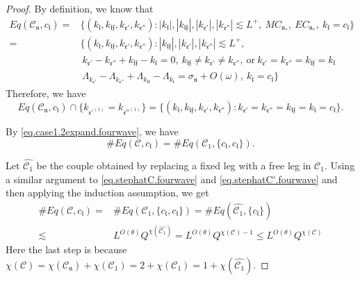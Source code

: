 \begin{proof}
    By definition, we know that 
    \begin{equation}
    \begin{split}
     Eq(\mathcal{C}_{\mathfrak{n}},c_{\mathfrak{l}})=&\{(k_{\mathfrak{l}}, k_{\mathfrak{l}\mathfrak{f}}, k_{\mathfrak{e}'}, k_{\mathfrak{e}''}): |k_{\mathfrak{l}}|, |k_{\mathfrak{l}\mathfrak{f}}|, |k_{\mathfrak{e}'}|, |k_{\mathfrak{e}''}| \lesssim L^+,\ MC_{\mathfrak{n}_*},\  EC_{\mathfrak{n}_*},\ k_{\mathfrak{l}}=c_{\mathfrak{l}}\}
     \\
     =&\{(k_{\mathfrak{l}}, k_{\mathfrak{l}\mathfrak{f}}, k_{\mathfrak{e}'}, k_{\mathfrak{e}''}): |k_{\mathfrak{l}\mathfrak{f}}|, |k_{\mathfrak{e}'}|, |k_{\mathfrak{e}''}| \lesssim L^+,
     \\
     &\ k_{\mathfrak{e}'}-k_{\mathfrak{e}''}+k_{\mathfrak{l}\mathfrak{f}}-k_{\mathfrak{l}}=0,\ k_{\mathfrak{l}\mathfrak{f}}\ne k_{\mathfrak{e}'}\ne k_{\mathfrak{e}''},\ \text{or}\ k_{\mathfrak{e}'}= k_{\mathfrak{e}''}=k_{\mathfrak{l}\mathfrak{f}}=k_{\mathfrak{l}}
     \\
     &\  \Lambda_{k_{\mathfrak{e}'}}-\Lambda_{k_{\mathfrak{e}''}}+\Lambda_{k_{\mathfrak{l}\mathfrak{f}}}-\Lambda_{k_{\mathfrak{l}}} =\sigma_{\mathfrak{n}}+O(\omega),\ k_{\mathfrak{l}}=c_{\mathfrak{l}}\}
    \end{split}
    \end{equation}
    Therefore, we have
    \begin{equation}
     Eq(\mathcal{C}_{\mathfrak{n}},c_{\mathfrak{l}})\cap \{k_{\mathfrak{e}'^{(1)}}=k_{\mathfrak{e}''^{(1)}}\}=\{(k_{\mathfrak{l}}, k_{\mathfrak{l}\mathfrak{f}}, k_{\mathfrak{e}'}, k_{\mathfrak{e}''}):k_{\mathfrak{e}'}=k_{\mathfrak{e}''}=k_{\mathfrak{l}\mathfrak{f}}=k_{\mathfrak{l}}=c_{\mathfrak{l}}\}.
    \end{equation}
    
    By \eqref{eq.case1.2expand.fourwave}, we have
    \begin{equation}
     \#Eq(\mathcal{C},c_{\mathfrak{l}})=\#Eq(\mathcal{C}_1, \{c_{\mathfrak{l}}, c_{\mathfrak{l}}\}).
    \end{equation}
    
    Let $\widehat{\mathcal{C}_1}$ be the couple obtained by replacing a fixed leg with a free leg in $\mathcal{C}_1$. Using a similar argument to \eqref{eq.stephatC.fourwave} and \eqref{eq.stephatC'.fourwave} and then applying the induction assumption, we get
    \begin{equation}\label{eq.case1.2expand'.fourwave}
    \begin{split}
     \#Eq(\mathcal{C},c_{\mathfrak{l}})=&\#Eq(\mathcal{C}_1, \{c_{\mathfrak{l}}, c_{\mathfrak{l}}\})=\#Eq(\widehat{\mathcal{C}_1}, \{c_{\mathfrak{l}}\})
     \\
     \lesssim& L^{O(\theta)} Q^{\chi(\widehat{\mathcal{C}_1})}=L^{O(\theta)} Q^{\chi(\mathcal{C})-1}\le L^{O(\theta)} Q^{\chi(\mathcal{C})}
    \end{split}
    \end{equation}
    Here the last step is because $\chi(\mathcal{C})=\chi(\mathcal{C}_{\mathfrak{n}})+\chi(\mathcal{C}_1)=2+\chi(\mathcal{C}_1)=1+\chi(\widehat{\mathcal{C}_1})$.
    

\end{proof}
